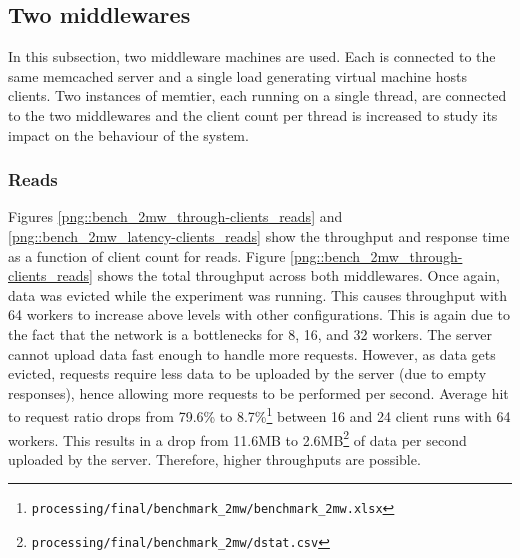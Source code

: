 \documentclass[11pt,a4paper]{article}
\begin{document}
\subsection{Two middlewares}
In this subsection, two middleware machines are used. Each is connected to the same memcached server and a single load generating virtual machine hosts clients. Two instances of memtier, each running on a single thread, are connected to the two middlewares and the client count per thread is increased to study its impact on the behaviour of the system.

\subsubsection{Reads}
Figures \ref{png::bench_2mw_through-clients_reads} and \ref{png::bench_2mw_latency-clients_reads} show the throughput and response time as a function of client count for reads. Figure \ref{png::bench_2mw_through-clients_reads} shows the total throughput across both middlewares. Once again, data was evicted while the experiment was running. This causes throughput with 64 workers to increase above levels with other configurations. This is again due to the fact that the network is a bottlenecks for 8, 16, and 32 workers. The server cannot upload data fast enough to handle more requests. However, as data gets evicted, requests require less data to be uploaded by the server (due to empty responses), hence allowing more requests to be performed per second. Average hit to request ratio drops from 79.6\% to 8.7\%\footnote{\texttt{processing/final/benchmark_2mw/benchmark_2mw.xlsx}} between 16 and 24 client runs with 64 workers. This results in a drop from 11.6MB to 2.6MB\footnote{\texttt{processing/final/benchmark_2mw/dstat.csv}} of data per second uploaded by the server. Therefore, higher throughputs are possible.
\end{document}
